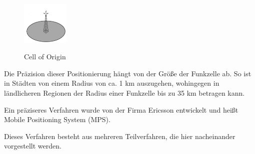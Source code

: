 \cite[S. 207]{Schiller2004}

\begin{figure}[h]
\centering
\includegraphics[width=0.2\textwidth]{ref/images/CellOfOrigin.PNG}
\caption[Cell of Origin]{Cell of Origin}
\label{fig:CoO}
\cite[S. 209]{Schiller2004}
\end{figure}

Die Präzision dieser Positionierung hängt von der Größe der Funkzelle ab. So ist in Städten von einem Radius von ca. 1 km auszugehen, wohingegen in ländlicheren Regionen der Radius einer Funkzelle bis zu 35 km betragen kann.
\cite[S. 207]{Schiller2004}


Ein präziseres Verfahren wurde von der Firma Ericsson entwickelt und heißt Mobile Positioning System (MPS). 
\cite[S. 207 - 208]{Schiller2004}

Dieses Verfahren besteht aus mehreren Teilverfahren, die hier nacheinander vorgestellt werden.

